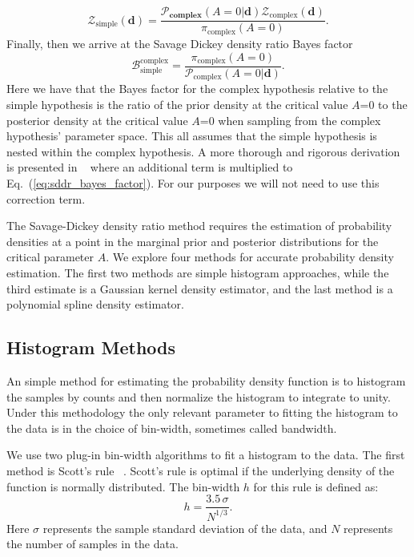 \begin{equation}
    \mathcal{Z}_{\mathrm{simple}}\left(\mathbf{d}\right) = \frac{\mathcal{P}_{\mathbf{complex}}\left(A=0 | \mathbf{d}\right) \mathcal{Z}_{\mathrm{complex}} \left(\mathbf{d} \right)} {\pi_{\mathrm{complex}} \left(A=0\right)}.
\end{equation}
Finally, then we arrive at the Savage Dickey density ratio Bayes factor
\begin{equation}\label{sddr_bayes_factor}
    \mathcal{B}^{\mathrm{complex}}_{\mathrm{simple}} = \frac{\pi_{\mathrm{complex}}\left(A=0\right)}{\mathcal{P}_{\mathrm{complex}}\left(A=0 | \mathbf{d}\right)}.
\end{equation}
Here we have that the Bayes factor for the complex hypothesis relative to the simple hypothesis is the ratio of the prior density at the critical value $A$=$0$ to the posterior density at the critical value $A$=$0$ when sampling from the complex hypothesis' parameter space. This all assumes that the simple hypothesis is nested within the complex hypothesis. A more thorough and rigorous derivation is presented in ~\cite{verdinelli1995computing} where an additional term is multiplied to Eq.~(\ref{eq:sddr_bayes_factor}). For our purposes we will not need to use this correction term.

The Savage-Dickey density ratio method requires the estimation of probability densities at a point in the marginal prior and posterior distributions for the critical parameter $A$. We explore four methods for accurate probability density estimation. The first two methods are simple histogram approaches, while the third estimate is a Gaussian kernel density estimator, and the last method is a polynomial spline density estimator.

\subsection{Histogram Methods}
An simple method for estimating the probability density function is to histogram the samples by counts and then normalize the histogram to integrate to unity. Under this methodology the only relevant parameter to fitting the histogram to the data is in the choice of bin-width, sometimes called bandwidth.

We use two plug-in bin-width algorithms to fit a histogram to the data. The first method is Scott's rule~\citep{scott1979optimal} . Scott's rule is optimal if the underlying density of the function is normally distributed. The bin-width $h$ for this rule is defined as:
\begin{equation}
    h = \frac{3.5 \, \sigma}{N^{1/3}}.
\end{equation}
Here $\sigma$ represents the sample standard deviation of the data, and $N$ represents the number of samples in the data.

